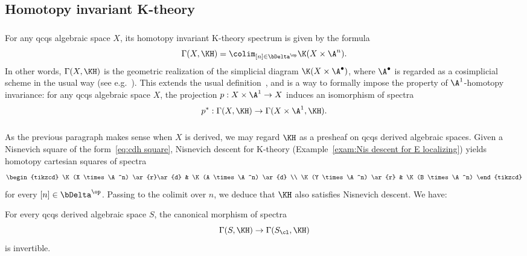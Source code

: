 \subsection{Homotopy invariant K-theory}\label{ssec:kh/kh}

\subsubsection{}

For any qcqs algebraic space $X$, its homotopy invariant K-theory spectrum is given by the formula
\begin{equation}\label{eq:Gamma(X, Lhtp(K))}
\Gamma(X, \KH) = \colim_{[n] \in \bDelta^{\op}} \K(X \times \A^n).
\end{equation}
In other words, $\Gamma(X, \KH)$ is the geometric realization of the simplicial diagram $\K(X \times \A^\bullet)$, where $\A^\bullet$ is regarded as a cosimplicial scheme in the usual way (see e.g.~\cite[p.~45]{MorelVoevodsky}). This extends the usual definition~\cite{WeibelKH,ThomasonTrobaugh}, and is a way to formally impose the property of $\A^1$-homotopy invariance: for any qcqs algebraic space $X$, the projection $p : X \times \A^1 \to X$ induces an isomorphism of spectra
\[
p^* : \Gamma(X, \KH) \to \Gamma(X \times \A^1, \KH).
\]

\subsubsection{}\label{sssec:KH derived}

As the previous paragraph makes sense when $X$ is derived, we may regard $\KH$ as a presheaf on qcqs derived algebraic spaces. Given a Nisnevich square of the form~\eqref{eq:cdh square}, Nisnevich descent for K-theory (Example~\ref{exam:Nis descent for E localizing}) yields homotopy cartesian squares of spectra
\[
\begin{tikzcd}
\K(X \times \A^n) \ar{r}\ar{d} & \K(A \times \A^n) \ar{d}
\\
\K(Y \times \A^n) \ar{r} & \K(B \times \A^n)
\end{tikzcd}
\]
for every $[n] \in \bDelta^{\op}$. Passing to the colimit over $n$, we deduce that $\KH$ also satisfies Nisnevich descent. We have:

\begin{theo}\label{thm:KH nil}
For every qcqs derived algebraic space $S$, the canonical morphism of spectra
\[
\Gamma(S, \KH) \to \Gamma(S_\cl, \KH)
\]
is invertible.
\end{theo}

